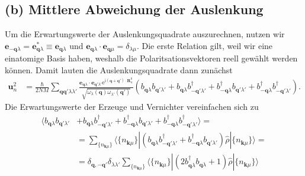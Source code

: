 \documentclass[english, parskip=full]{scrartcl}
\renewcommand{\bra}{}
\newcommand{\kla}{}
\renewcommand{\i}{\text{i}}
\newcommand{\e}{\text{e}}
\begin{document}
\subsection*{(b) Mittlere Abweichung der Auslenkung}
Um die Erwartungswerte der Auslenkungsquadrate auszurechnen, nutzen wir $\textbf{e}_{-\textbf{q}\lambda} = \textbf{e}_{\textbf{q} \lambda}^\ast \equiv \textbf{e}_{\textbf{q} \lambda}$ und $\textbf{e}_{\textbf{q} \lambda} \cdot \textbf{e}_{\textbf{q} \mu} = \delta_{\lambda\mu}$.
Die erste Relation gilt, weil wir eine einatomige Basis haben, weshalb die Polaritsationsvektoren reell gewählt werden können.
Damit lauten die Auslenkungsquadrate dann zunächst
\begin{align}
\textbf{u}_n^2 &= \frac{\hbar}{2NM} \sum_{\textbf{q}\textbf{q}' \lambda \lambda'} \frac{\textbf{e}_{\textbf{q} \lambda} \cdot \textbf{e}_{\textbf{q}' \lambda'} \e^{\i (\textbf{q} + \textbf{q}') \cdot \textbf{R}_n^0} }{\sqrt{\omega_\lambda(\textbf{q}) \omega_{\lambda'} (\textbf{q}')}}  \kla\left( b_{\textbf{q} \lambda} b_{\textbf{q}' \lambda'} + b_{\textbf{q} \lambda} b^\dagger_{-\textbf{q}' \lambda'} + b^\dagger_{-\textbf{q} \lambda} b_{\textbf{q}' \lambda'} + b^\dagger_{-\textbf{q} \lambda} b^\dagger_{-\textbf{q}' \lambda'} \right).
\end{align}
Die Erwartungswerte der Erzeuge und Vernichter vereinfachen sich zu
\begin{align}
\bra\langle b_{\textbf{q}\lambda}b_{\textbf{q}'\lambda'} &+ b_{\textbf{q}\lambda} b_{-\textbf{q}'\lambda'}^\dagger + b_{-\textbf{q}\lambda}^\dagger b_{\textbf{q}'\lambda'} + b_{-\textbf{q}\lambda}^\dagger b_{-\textbf{q}'\lambda'}^\dagger \rangle = \\
&= \sum_{\{n_{\textbf{k}\mu} \}} \langle \{n_{\textbf{k}\mu} \} | \left(  b_{\textbf{q}\lambda} b_{-\textbf{q}'\lambda'}^\dagger + b_{-\textbf{q}\lambda}^\dagger b_{\textbf{q}'\lambda'} \right) \hat{\rho} | \{n_{\textbf{k}\mu}\} \rangle = \\
&= \delta_{\textbf{q},-\textbf{q}'} \delta_{\lambda\lambda'} \sum_{\{n_{\textbf{k}\mu} \}} \langle \{n_{\textbf{k}\mu} \} | \left(  2b_{\textbf{q}\lambda}^\dagger b_{\textbf{q}\lambda} + 1 \right) \hat{\rho} | \{n_{\textbf{k}\mu}\} \rangle
\end{align}
\end{document}

